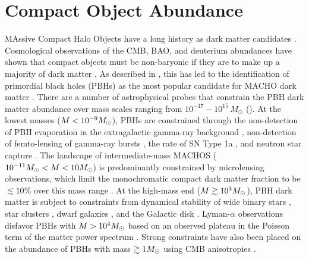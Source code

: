 \section{Compact Object Abundance }
\label{sec:compact_objects}

MAssive Compact Halo Objects \citep[MACHOs;][]{1991ApJ...366..412G} have a long history as dark matter candidates \citep{1974ApJ...193L...1O, 1980ApJS...44...73B, 1981ApJ...243..140G, 1986ApJ...304....1P, Bellido:1996, Clesse:2015, Bird:2016, Clesse:2016}. 
Cosmological observations of the CMB, BAO, and deuterium abundances have shown that compact objects must be non-baryonic if they are to make up a majority of dark matter \citep[\eg][]{Ade:2015xua}. 
As described in , this has led to the identification of primordial black holes (PBHs) as the most popular candidate for MACHO dark matter \citep{Bellido:1996}.
There are a number of astrophysical probes that constrain the PBH dark matter abundance over mass scales ranging from $10^{-17}-10^{15}\,M_\odot$ ().
At the lowest masses ($M < 10^{-9}M_\odot$), PBHs are constrained through the non-detection of PBH evaporation in the extragalactic gamma-ray background \citep[\eg,][]{0912.5297, 1604.05349}, non-detection of femto-lensing of gamma-ray bursts \citep[\eg,][]{1204.2056}, the rate of SN Type 1a \citep{1805.07381}, and neutron star capture \citep[\eg,][]{1301.4984}.
The landscape of intermediate-mass MACHOS ($10^{-11} M_\odot < M < 10 M_\odot$) is predominantly constrained by microlensing observations, which limit the monochromatic compact dark matter fraction to be $\lesssim 10\%$ over this mass range \citep[\eg,][]{2001ApJ...550L.169A, 2007A&A...469..387T, 2009MNRAS.397.1228W, 1509.04899, 1701.02151, Calcino:2018}.
At the high-mass end ($M \gtrsim 10^3M_\odot$), PBH dark matter is subject to constraints from dynamical stability of wide binary stars \citep[\eg,][]{2009MNRAS.396L..11Q, 2004ApJ...601..311Y}, star clusters \citep[\eg,][]{2016ApJ...824L..31B, 1611.05052}, dwarf galaxies \citep{1704.01668}, and the Galactic disk \citep[\eg,][]{1985ApJ...299..633L, 1994ApJ...437..184X}.
Lyman-$\alpha$ observations disfavor PBHs with $M > 10^4M_\odot$ based on an observed plateau in the Poisson term of the matter power spectrum \citep{astro-ph/0302035}.
Strong constraints have also been placed on the abundance of PBHs with mass $\gtrsim 1 M_\odot$ using CMB anisotropies \citep{2008ApJ...680..829R}.
